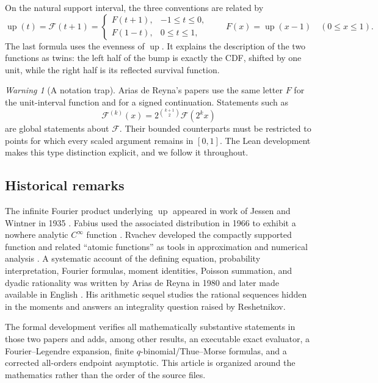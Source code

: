 \documentclass[11pt]{article}
\numberwithin{equation}{section}
\theoremstyle{definition}
\theoremstyle{remark}
\newtheorem{warning}[theorem]{Warning}
\newcommand{\GF}{\mathcal F}
\newcommand{\upf}{\operatorname{up}}
\begin{document}
On the natural support interval, the three conventions are related by
\begin{equation}\label{p3:eq:F-up-relations}
 \upf(t)=\GF(t+1)=
 \begin{cases}
   F(t+1),&-1\le t\le0,\\
   F(1-t),&0\le t\le1,
 \end{cases}
 \qquad
 F(x)=\upf(x-1)\quad(0\le x\le1).
\end{equation}
The last formula uses the evenness of $\upf$.  It explains the description of the two functions as twins: the left half of the bump is exactly the CDF, shifted by one unit, while the right half is its reflected survival function.

\begin{warning}[A notation trap]
Arias de Reyna's papers use the same letter $F$ for the unit-interval function and for a signed continuation.  Statements such as
\[
 \GF^{(k)}(x)=2^{\binom{k+1}{2}}\GF(2^kx)
\]
are global statements about $\GF$.  Their bounded counterparts must be restricted to points for which every scaled argument remains in $[0,1]$.  The Lean development makes this type distinction explicit, and we follow it throughout.
\end{warning}

\subsection{Historical remarks}

The infinite Fourier product underlying $\upf$ appeared in work of Jessen and Wintner in 1935 \cite{p3:JessenWintner}.  Fabius used the associated distribution in 1966 to exhibit a nowhere analytic $C^\infty$ function \cite{p3:Fabius1966}.  Rvachev developed the compactly supported function and related ``atomic functions'' as tools in approximation and numerical analysis \cite{p3:Rvachev1990}.  A systematic account of the defining equation, probability interpretation, Fourier formulas, moment identities, Poisson summation, and dyadic rationality was written by Arias de Reyna in 1980 and later made available in English \cite{p3:Arias05442}.  His arithmetic sequel \cite{p3:Arias06487} studies the rational sequences hidden in the moments and answers an integrality question raised by Reshetnikov.

The formal development \cite{p3:ProveIt} verifies all mathematically substantive statements in those two papers and adds, among other results, an executable exact evaluator, a Fourier--Legendre expansion, finite $q$-binomial/Thue--Morse formulas, and a corrected all-orders endpoint asymptotic.  This article is organized around the mathematics rather than the order of the source files.
\end{document}
